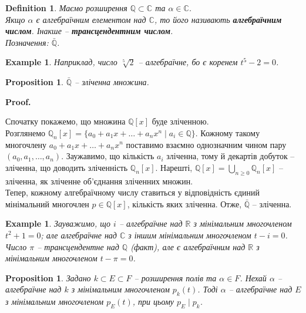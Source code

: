 \documentclass[a4paper, 10pt]{article}
\makeatletter
\theoremstyle{theoremdd}
\theoremstyle{theoremdd}
\newtheorem{definition}[theorem]{Definition}
\theoremstyle{theoremdd}
\theoremstyle{theoremdd}
\theoremstyle{theoremdd}
\newtheorem{example}[theorem]{Example}
\theoremstyle{theoremdd}
\theoremstyle{theoremdd}
\theoremstyle{theoremdd}
\theoremstyle{theoremdd}
\newtheorem{proposition}[theorem]{Proposition}
\theoremstyle{theoremdd}
\theoremstyle{theoremdd}
\theoremstyle{theoremdd}
\theoremstyle{theoremdd}
\theoremstyle{theoremdd}
\theoremstyle{theoremdd}
\renewenvironment{proof}[1][Proof.\\]{\par
\pushQED{\hfill \qed}%
\normalfont \topsep6\p@\@plus6\p@\relax
\trivlist
\item\relax
{\bfseries
#1\@addpunct{.}}\hspace\labelsep\ignorespaces
}{%
\popQED\endtrivlist\@endpefalse
}
\makeatother
\begin{document}
\begin{definition}
Маємо розширення $\mathbb{Q} \subset \mathbb{C}$ та $\alpha \in \mathbb{C}$.\\
Якщо $\alpha$ є алгебраїчним елементом над $\mathbb{C}$, то його називають \textbf{алгебраїчним числом}. Інакше -- \textbf{трансцендентним числом}.\\
Позначення: $\bar{\mathbb{Q}}$.
\end{definition}

\begin{example}
Наприклад, число $\sqrt[5]{2}$ -- алгебраїчне, бо є коренем $t^5 - 2 = 0$.
\end{example}

\begin{proposition}
$\bar{\mathbb{Q}}$ -- зліченна множина.
\end{proposition}

\begin{proof}
Спочатку покажемо, що множина $\mathbb{Q}[x]$ буде зліченною.\\
Розглянемо $\mathbb{Q}_n[x] = \{ a_0 + a_1 x + \dots + a_n x^n \mid a_i \in \mathbb{Q} \}$. Кожному такому многочлену $a_0 + a_1 x + \dots + a_n x^n$ поставимо взаємно однозначним чином пару $(a_0,a_1,\dots,a_n)$. Заужавимо, що кількість $a_i$ зліченна, тому й декартів добуток -- зліченна, що доводить зліченність $\mathbb{Q}_n[x]$. Нарешті, $\mathbb{Q}[x] = \displaystyle\bigcup_{n \geq 0} \mathbb{Q}_n[x]$ -- зліченна, як зліченне об'єднання зліченних множин.\\
Тепер, кожному алгебраїчному числу ставиться у відповідність єдиний мінімальний многочлен $p \in \mathbb{Q}[x]$, кількість яких зліченна. Отже, $\bar{\mathbb{Q}}$ -- зліченна.
\end{proof}

\begin{example}
Зауважимо, що $i$ -- алгебраїчне над $\mathbb{R}$ з мінімальним многочленом $t^2 + 1 = 0$; але алгебраїчне над $\mathbb{C}$ з іншим мінімальним многочленом $t - i = 0$.\\
Число $\pi$ -- трансцендентне над $\mathbb{Q}$ (факт), але є алгебраїчним над $\mathbb{R}$ з мінімальним многочленом $t-\pi = 0$.
\end{example}

\begin{proposition}
\label{algebraic_over_intermediate_field}
Задано $k \subset E \subset F$ -- розширення полів та $\alpha \in F$. Нехай $\alpha$ -- алгебраїчне над $k$ з мінімальним многочленом $p_k(t)$. Тоді $\alpha$ -- алгебраїчне над $E$ з мінімальним многочленом $p_E(t)$, при цьому $p_E \mid p_k$.
\end{proposition}
\end{document}
